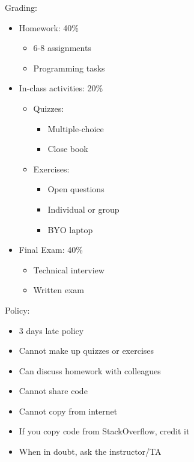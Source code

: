 \documentclass[12pt]{article}
\begin{document}
Grading:
\begin{itemize}
    \item Homework: 40\%
    \begin{itemize}
        \item 6-8 assignments
        \item Programming tasks
    \end{itemize}

    \item In-class activities: 20\%
    \begin{itemize}
        \item Quizzes:
        \begin{itemize}
            \item Multiple-choice
            \item Close book
        \end{itemize}
        \item Exercises:
        \begin{itemize}
            \item Open questions
            \item Individual or group
            \item BYO laptop
        \end{itemize}
    \end{itemize}
    
    \item Final Exam: 40\%
    \begin{itemize}
        \item Technical interview
        \item Written exam
    \end{itemize}
\end{itemize}

Policy:
\begin{itemize}
    \item 3 days late policy
    \item Cannot make up quizzes or exercises
    \item Can discuss homework with colleagues
    \item Cannot share code
    \item Cannot copy from internet
    \item If you copy code from StackOverflow, credit it 
    \item When in doubt, ask the instructor/TA
\end{itemize}

\newpage
\end{document}
